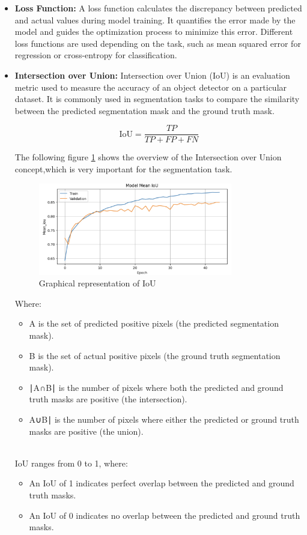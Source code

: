 \begin{itemize}
\item \textbf{Loss Function: }A loss function calculates the discrepancy between predicted and actual values during model training. It quantifies the error
made by the model and guides the optimization process to minimize this
error. Different loss functions are used depending on the task, such as mean
squared error for regression or cross-entropy for classification.
\\

\item \textbf{Intersection over Union: }Intersection over Union (IoU) is an evaluation metric used to measure the accuracy of an object detector on a particular dataset. It is commonly used in segmentation tasks to compare the similarity between the predicted segmentation mask and the ground truth mask.

\begin{equation}
\text{IoU} = \frac{TP}{TP + FP + FN}
\end{equation}

The following figure \ref{iou} shows the overview of the Intersection over Union concept,which is very important for the segmentation task.

\begin{figure}[H]
    \centering
    \includegraphics[width=0.8\textwidth]{figs/iou.png}
    \caption{Graphical representation of IoU}
    \label{iou}
\end{figure}

Where:
\begin{itemize}
    \item A is the set of predicted positive pixels (the predicted segmentation mask).
    \item B is the set of actual positive pixels (the ground truth segmentation mask).
    \item ∣A∩B∣ is the number of pixels where both the predicted and ground truth masks are positive (the intersection).
    \item A∪B∣ is the number of pixels where either the predicted or ground truth masks are positive (the union).
\end{itemize}
\\
IoU ranges from 0 to 1, where:
\begin{itemize}
    \item An IoU of 1 indicates perfect overlap between the predicted and ground truth masks.
    \item An IoU of 0 indicates no overlap between the predicted and ground truth masks.
\end{itemize}






\end{itemize}
